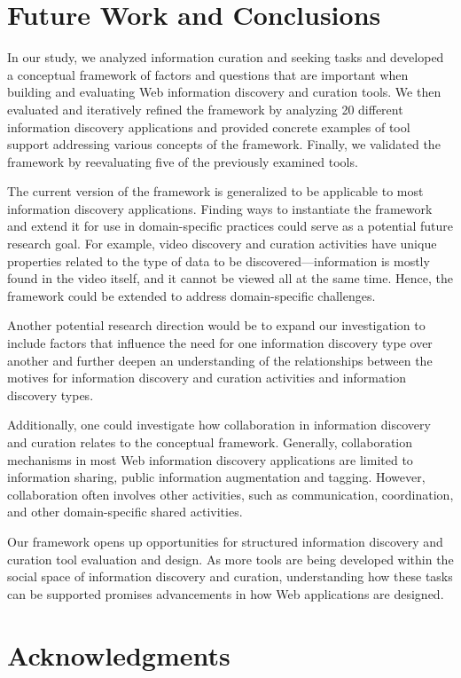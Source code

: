 \documentclass{sigchi}
\begin{document}
\section{Future Work and Conclusions}
\label{section:future_work}
In our study, we analyzed information curation and seeking tasks and developed a conceptual framework of factors and questions that are important when building and evaluating Web information discovery and curation tools. We then evaluated and iteratively refined the framework by analyzing 20 different information discovery applications and provided concrete examples of tool support addressing various concepts of the framework. Finally, we validated the framework by reevaluating five of the previously examined tools.

The current version of the framework is generalized to be applicable to most information discovery applications. Finding ways to instantiate the framework and extend it for use in domain-specific practices could serve as a potential future research goal. For example, video discovery and curation activities have unique properties related to the type of data to be discovered---information is mostly found in the video itself, and it cannot be viewed all at the same time. Hence, the framework could be extended to address domain-specific challenges. 

Another potential research direction would be to expand our investigation to include factors that influence the need for one information discovery type over another and further deepen an understanding of the relationships between the motives for information discovery and curation activities and information discovery types. 

Additionally, one could investigate how collaboration in information discovery and curation relates to the conceptual framework. Generally, collaboration mechanisms in most Web information discovery applications are limited to information sharing, public information augmentation and tagging. However, collaboration often involves other activities, such as communication, coordination, and other domain-specific shared activities.

Our framework opens up opportunities for structured information discovery and curation tool evaluation and design. As more tools are being developed within the social space of information discovery and curation, understanding how these tasks can be supported promises advancements in how Web applications are designed.

\section{Acknowledgments}
\end{document}
